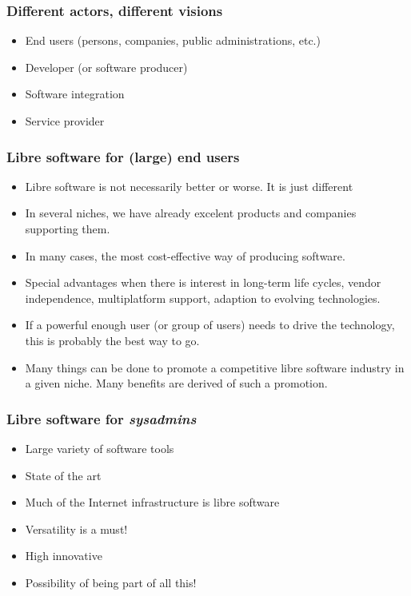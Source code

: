 \documentclass{beamer}
\begin{document}

\begin{frame}
\frametitle{Different actors, different visions}

\begin{itemize}
\item End users (persons, companies, public administrations, etc.)
\item Developer (or software producer)
\item Software integration
\item Service provider
\end{itemize}

\end{frame}



\begin{frame}
\frametitle{Libre software for (large) end users}

\begin{itemize}
\item Libre software is not necessarily better or worse. It is 
  just different
\item In several niches, we have already excelent products and
  companies supporting them.
\item In many cases, the most cost-effective way of producing
  software.
\item Special advantages when there is interest in long-term life
  cycles, vendor independence, multiplatform support, adaption to
  evolving technologies.
\item If a powerful enough user (or group of users) needs to drive the
  technology, this is probably the best way to go.
\item Many things can be done to promote a competitive
  libre software industry in a given niche. Many benefits
  are derived of such a promotion.
\end{itemize}
\end{frame}


\begin{frame}
\frametitle{Libre software for \emph{sysadmins}}

\begin{itemize}
\item Large variety of software tools
\item State of the art
\item Much of the Internet infrastructure is libre software
\item Versatility is a must!
\item High innovative
\item Possibility of being part of all this!
\end{itemize}

\end{frame}
\end{document}
